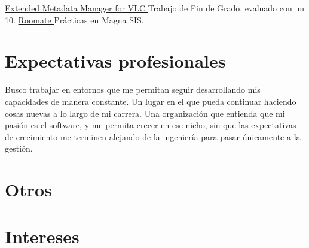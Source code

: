 \documentclass[letterpaper]{twentysecondcv} %
\begin{document}
\begin{twenty} %
    	{\href{https://github.com/ASantosVal/EMM_for_VLC}
    	{Extended Metadata Manager for VLC \faExternalLink} }
    	{}
    	{Trabajo de Fin de Grado, evaluado con un 10.}
    	{\href{https://roomate-magnarenove.herokuapp.com/}
    	{Roomate \faExternalLink} }
    	{}
    	{Prácticas en Magna SIS.}
\end{twenty}



\section{Expectativas profesionales}

Busco trabajar en entornos que me permitan seguir desarrollando mis capacidades de manera constante. Un lugar en el que pueda continuar haciendo cosas nuevas a lo largo de mi carrera. Una organización que entienda que mi pasión es el software, y me permita crecer en ese nicho, sin que las expectativas de crecimiento me terminen alejando de la ingeniería para pasar únicamente a la gestión.


\section{Otros}

\begin{customList} %
\end{customList}


\section{Intereses}
\end{document}
